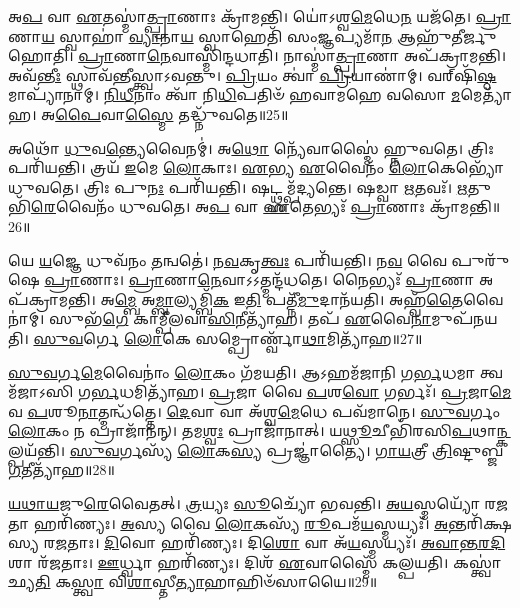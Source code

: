 𑌅\-\ul{𑌪} 𑌵𑌾 \ul{𑌏}\-𑌤𑌸𑍍𑌮𑌾॑\-\ul{𑌤𑍍𑌪𑍍𑌰𑌾}\-𑌣𑌾𑌃 𑌕𑍍𑌰𑌾᳴𑌮𑌨𑍍𑌤𑌿।
𑌯𑍋॑𑌽𑌶𑍍𑌵\-\ul{𑌮𑍇}\-𑌧𑍇\-\ul{𑌨} 𑌯𑌜᳴𑌤𑍇।
\-\ul{𑌪𑍍𑌰𑌾}\-𑌣𑌾\-\ul{𑌯} 𑌸𑍍𑌵𑌾𑌹𑌾॑ \ul{𑌵𑍍𑌯𑌾}\-𑌨𑌾\-\ul{𑌯} 𑌸𑍍𑌵𑌾𑌹𑍇𑌤𑌿᳴ 𑌸𑌂\-\ul{𑌜𑍍𑌞}\-𑌪𑍍𑌯𑌮𑌾᳴\-\ul{𑌨} 𑌆𑌹𑍁᳴𑌤𑍀𑌰𑍍𑌜𑍁𑌹𑍋𑌤𑌿।
\-\ul{𑌪𑍍𑌰𑌾}\-𑌣𑌾\-\ul{𑌨𑍇}\-𑌵𑌾𑌸𑍍𑌮𑌿᳴𑌨𑍍𑌦𑌧𑌾𑌤𑌿।
𑌨𑌾𑌸𑍍𑌮𑌾॑\-\ul{𑌤𑍍𑌪𑍍𑌰𑌾}\-𑌣𑌾 𑌅𑌪᳴𑌕𑍍𑌰𑌾𑌮𑌨𑍍𑌤𑌿।
𑌅𑌵᳴\-\ul{𑌨𑍍𑌤𑍀𑌃} 𑌸𑍍𑌥𑌾𑌵᳴𑌨𑍍𑌤𑍀𑌸𑍍𑌤𑍍𑌵𑌾\-𑌽𑌵𑌨𑍍𑌤𑍁।
\-\ul{𑌪𑍍𑌰𑌿}\-𑌯𑌂 𑌤𑍍𑌵𑌾॑ \ul{𑌪𑍍𑌰𑌿}\-𑌯𑌾𑌣𑌾॑𑌮𑍍।
𑌵𑌰𑍍‌\mbox{}𑌷𑌿᳴\-\ul{𑌷𑍍𑌠}\-𑌮𑌾𑌪𑍍𑌯𑌾᳴𑌨𑌾𑌮𑍍।
\-\ul{𑌨𑌿}\-\-\ul{𑌧𑍀}\-𑌨𑌾𑌂 𑌤𑍍𑌵𑌾᳴ 𑌨𑌿\-\ul{𑌧𑌿}\-𑌪𑌤𑌿𑍞᳴ 𑌹𑌵𑌾𑌮𑌹𑍇 𑌵𑌸𑍋 \ul{𑌮}\-𑌮𑍇𑌤𑍍𑌯𑌾᳴𑌹।
𑌅\-\ul{𑌪𑍈}\-𑌵𑌾\-\ul{𑌸𑍍𑌮𑍈} 𑌤𑌦𑍍𑌧𑍍𑌨𑍁᳴𑌵𑌤𑍇॥25॥

𑌅𑌥𑍋᳴ \ul{𑌧𑍁}\-𑌵\-\ul{𑌨𑍍𑌤𑍍𑌯𑍇}\-𑌵𑍈𑌨𑌮𑍍॑।
𑌅\-\ul{𑌥𑍋} 𑌨𑍍𑌯𑍇᳴𑌵𑌾𑌸𑍍𑌮𑍈॑ 𑌹𑍍𑌨𑍁𑌵𑌤𑍇।
𑌤𑍍𑌰𑌿𑌃 𑌪𑌰𑌿᳴𑌯𑌨𑍍𑌤𑌿।
𑌤𑍍𑌰𑌯᳴ \ul{𑌇}\-𑌮𑍇 \ul{𑌲𑍋}\-𑌕𑌾𑌃।
\-\ul{𑌏}\-𑌭𑍍𑌯 \ul{𑌏}\-𑌵𑍈𑌨𑌂᳴ \ul{𑌲𑍋}\-𑌕𑍇𑌭𑍍𑌯𑍋᳴ 𑌧𑍁𑌵𑌤𑍇।
𑌤𑍍𑌰𑌿𑌃 𑌪𑍁\-\ul{𑌨𑌃} 𑌪𑌰𑌿᳴𑌯𑌨𑍍𑌤𑌿।
𑌷𑌟𑍍𑌥𑍍𑌸𑌮𑍍𑌪᳴𑌦𑍍𑌯𑌨𑍍𑌤𑍇।
𑌷𑌡𑍍𑌵𑌾 \ul{𑌋}\-𑌤𑌵𑌃᳴।
\-\ul{𑌋}\-𑌤𑍁𑌭𑌿᳴\-\ul{𑌰𑍇}\-𑌵𑍈𑌨𑌂᳴ 𑌧𑍁𑌵𑌤𑍇।
𑌅\-\ul{𑌪} 𑌵𑌾 \ul{𑌏}\-𑌤𑍇𑌭𑍍𑌯𑌃᳴ \ul{𑌪𑍍𑌰𑌾}\-𑌣𑌾𑌃 𑌕𑍍𑌰𑌾᳴𑌮𑌨𑍍𑌤𑌿॥26॥

𑌯𑍇 \ul{𑌯}\-𑌜𑍍𑌞𑍇 𑌧𑍁𑌵᳴𑌨𑌂 \ul{𑌤}\-𑌨𑍍𑌵𑌤𑍇॑।
\-\ul{𑌨}\-\-\ul{𑌵}\-𑌕𑍃\-\ul{𑌤𑍍𑌵𑌃} 𑌪𑌰𑌿᳴𑌯𑌨𑍍𑌤𑌿।
𑌨\-\ul{𑌵} 𑌵𑍈 𑌪𑍁𑌰𑍁᳴𑌷𑍇 \ul{𑌪𑍍𑌰𑌾}\-𑌣𑌾𑌃।
\-\ul{𑌪𑍍𑌰𑌾}\-𑌣𑌾\-\ul{𑌨𑍇}\-𑌵𑌾𑌽𑌽𑌤𑍍𑌮𑌨𑍍𑌦᳴𑌧𑌤𑍇।
𑌨𑍈𑌭𑍍𑌯𑌃᳴ \ul{𑌪𑍍𑌰𑌾}\-𑌣𑌾 𑌅𑌪᳴𑌕𑍍𑌰𑌾𑌮𑌨𑍍𑌤𑌿।
𑌅\-\ul{𑌮𑍍𑌬𑍇} 𑌅\-\ul{𑌮𑍍𑌬𑌾}\-𑌲𑍍𑌯𑌮𑍍𑌬𑌿᳴\-\ul{𑌕} 𑌇\-\ul{𑌤𑌿} 𑌪𑌤𑍍𑌨𑍀᳴\-\ul{𑌮𑍁}\-𑌦𑌾𑌨᳴𑌯𑌤𑌿।
𑌅𑌹𑍍𑌵᳴\-\ul{𑌤𑍈}\-𑌵𑍈𑌨𑌾॑𑌮𑍍।
𑌸𑍁𑌭᳴\-\ul{𑌗𑍇} 𑌕𑌾𑌮𑍍𑌪𑍀᳴𑌲𑌵𑌾\-\ul{𑌸𑌿}\-𑌨𑍀𑌤𑍍𑌯𑌾᳴𑌹।
𑌤𑌪᳴ \ul{𑌏}\-𑌵𑍈\-\ul{𑌨𑌾}\-𑌮𑍁𑌪᳴𑌨𑌯𑌤𑌿।
\-\ul{𑌸𑍁}\-\-\ul{𑌵}\-𑌰𑍍𑌗𑍇 \ul{𑌲𑍋}\-𑌕𑍇 𑌸𑌮𑍍𑌪𑍍𑌰𑍋𑌰𑍍𑌣𑍍𑌵𑌾᳴\-\ul{𑌥𑌾}\-𑌮𑌿𑌤𑍍𑌯𑌾᳴𑌹॥27॥

\-\ul{𑌸𑍁}\-\-\ul{𑌵}\-𑌰𑍍𑌗\-\ul{𑌮𑍇}\-𑌵𑍈𑌨𑌾𑌂॑ \ul{𑌲𑍋}\-𑌕𑌂 𑌗᳴𑌮𑌯𑌤𑌿।
𑌆𑌽𑌹𑌮᳴𑌜𑌾𑌨𑌿 𑌗\-\ul{𑌰𑍍𑌭}\-𑌧𑌮𑌾 𑌤𑍍𑌵𑌮᳴𑌜𑌾𑌽𑌸𑌿 𑌗\-\ul{𑌰𑍍𑌭}\-𑌧𑌮𑌿𑌤𑍍𑌯𑌾᳴𑌹।
\-\ul{𑌪𑍍𑌰}\-𑌜𑌾 𑌵𑍈 \ul{𑌪}\-𑌶\-\ul{𑌵𑍋} 𑌗𑌰𑍍𑌭𑌃᳴।
\-\ul{𑌪𑍍𑌰}\-𑌜𑌾\-\ul{𑌮𑍇}\-𑌵 \ul{𑌪}\-𑌶𑍂\-\ul{𑌨𑌾}\-𑌤𑍍𑌮𑌨𑍍𑌧᳴𑌤𑍍𑌤𑍇।
\-\ul{𑌦𑍇}\-𑌵𑌾 𑌵𑌾 𑌅᳴𑌶𑍍𑌵\-\ul{𑌮𑍇}\-𑌧𑍇 𑌪𑌵᳴𑌮𑌾𑌨𑍇।
\-\ul{𑌸𑍁}\-\-\ul{𑌵}\-𑌰𑍍𑌗𑌂 \ul{𑌲𑍋}\-𑌕𑌂 𑌨 𑌪𑍍𑌰𑌾𑌜𑌾᳴𑌨𑌨𑍍।
𑌤𑌮\-\ul{𑌶𑍍𑌵𑌃} 𑌪𑍍𑌰𑌾𑌜𑌾᳴𑌨𑌾𑌤𑍍।
𑌯\-\ul{𑌥𑍍𑌸𑍂}\-𑌚𑍀𑌭𑌿᳴𑌰𑌸𑌿\-\ul{𑌪}\-𑌥𑌾\-\ul{𑌨𑍍𑌕}\-𑌲𑍍𑌪𑌯᳴𑌨𑍍𑌤𑌿।
\-\ul{𑌸𑍁}\-\-\ul{𑌵}\-𑌰𑍍𑌗𑌸𑍍𑌯᳴ \ul{𑌲𑍋}\-𑌕\-\ul{𑌸𑍍𑌯} 𑌪𑍍𑌰𑌜𑍍𑌞𑌾॑𑌤𑍍𑌯𑍈।
\-\ul{𑌗𑌾}\-\-\ul{𑌯}\-𑌤𑍍𑌰𑍀 \ul{𑌤𑍍𑌰𑌿}\-𑌷𑍍𑌟𑍁𑌬𑍍𑌜\-\ul{𑌗}\-𑌤𑍀𑌤𑍍𑌯𑌾᳴𑌹॥28॥

\-\ul{𑌯}\-\-\ul{𑌥𑌾}\-\-\ul{𑌯}\-𑌜𑍁\-\ul{𑌰𑍇}\-𑌵𑍈𑌤𑌤𑍍।
\-\ul{𑌤𑍍𑌰}\-𑌯𑍍𑌯𑌃 \ul{𑌸𑍂}\-𑌚𑍍𑌯𑍋᳴ 𑌭𑌵𑌨𑍍𑌤𑌿।
\-\ul{𑌅}\-\-\ul{𑌯}\-𑌸𑍍𑌮𑌯𑍍𑌯𑍋᳴ 𑌰\-\ul{𑌜}\-𑌤𑌾 𑌹𑌰𑌿᳴𑌣𑍍𑌯𑌃।
\-\ul{𑌅}\-𑌸𑍍𑌯 𑌵𑍈 \ul{𑌲𑍋}\-𑌕𑌸𑍍𑌯᳴ \ul{𑌰𑍂}\-𑌪𑌮᳴\-\ul{𑌯}\-𑌸𑍍𑌮𑌯𑍍𑌯𑌃᳴।
\-\ul{𑌅}\-𑌨𑍍𑌤𑌰𑌿᳴𑌕𑍍𑌷𑌸𑍍𑌯 𑌰\-\ul{𑌜}\-𑌤𑌾𑌃।
\-\ul{𑌦𑌿}\-𑌵𑍋 𑌹𑌰𑌿᳴𑌣𑍍𑌯𑌃।
𑌦𑌿\-\ul{𑌶𑍋} 𑌵𑌾 𑌅᳴\-\ul{𑌯}\-𑌸𑍍𑌮𑌯𑍍𑌯𑌃᳴।
\-\ul{𑌅}\-\-\ul{𑌵𑌾}\-\-\ul{𑌨𑍍𑌤}\-\-\ul{𑌰}\-\-\ul{𑌦𑌿}\-𑌶𑌾 𑌰᳴\-\ul{𑌜}\-𑌤𑌾𑌃।
\-\ul{𑌊}\-𑌰𑍍𑌧𑍍𑌵𑌾 𑌹𑌰𑌿᳴𑌣𑍍𑌯𑌃।
𑌦𑌿𑌶᳴ \ul{𑌏}\-𑌵𑌾𑌸𑍍𑌮𑍈᳴ 𑌕𑌲𑍍𑌪𑌯𑌤𑌿।
𑌕𑌸𑍍𑌤𑍍𑌵𑌾॑ 𑌛𑍍𑌯\-\ul{𑌤𑌿} 𑌕\-\ul{𑌸𑍍𑌤𑍍𑌵𑌾} 𑌵𑌿\-\ul{𑌶𑌾}\-𑌸𑍍𑌤𑍀\-\ul{𑌤𑍍𑌯𑌾}\-𑌹𑌾𑌹𑌿𑍞᳴𑌸𑌾𑌯𑍈॥29॥\anuvakamend[\-\ul{𑌹𑍍𑌨𑍁}\-\-\ul{𑌵}\-\-\ul{𑌤𑍇} \ul{𑌕𑍍𑌰𑌾}\-\-\ul{𑌮}\-\-\ul{𑌨𑍍𑌤𑍍𑌯𑍂}\-\-\ul{𑌰𑍍𑌣𑍍𑌵𑌾}\-\-\ul{𑌥𑌾}\-𑌮𑌿𑌤𑍍𑌯𑌾᳴\-\ul{𑌹} 𑌜\-\ul{𑌗}\-𑌤𑍀𑌤𑍍𑌯𑌾᳴𑌹 𑌕𑌲𑍍𑌪\-\ul{𑌯}\-𑌤𑍍𑌯𑍇𑌕𑌂᳴ 𑌚]

